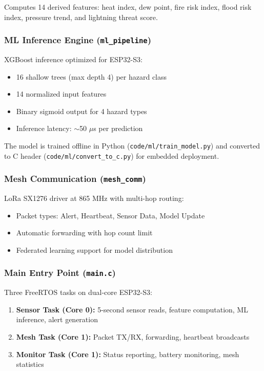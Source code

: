 Computes 14 derived features: heat index, dew point, fire risk index, flood risk index, pressure trend, and lightning threat score.

\subsubsection{ML Inference Engine (\texttt{ml\_pipeline})}
XGBoost inference optimized for ESP32-S3:
\begin{itemize}
    \item 16 shallow trees (max depth 4) per hazard class
    \item 14 normalized input features
    \item Binary sigmoid output for 4 hazard types
    \item Inference latency: $\sim$50 $\mu$s per prediction
\end{itemize}

The model is trained offline in Python (\texttt{code/ml/train\_model.py}) and converted to C header (\texttt{code/ml/convert\_to\_c.py}) for embedded deployment.

\subsubsection{Mesh Communication (\texttt{mesh\_comm})}
LoRa SX1276 driver at 865 MHz with multi-hop routing:
\begin{itemize}
    \item Packet types: Alert, Heartbeat, Sensor Data, Model Update
    \item Automatic forwarding with hop count limit
    \item Federated learning support for model distribution
\end{itemize}

\subsubsection{Main Entry Point (\texttt{main.c})}
Three FreeRTOS tasks on dual-core ESP32-S3:
\begin{enumerate}
    \item \textbf{Sensor Task (Core 0):} 5-second sensor reads, feature computation, ML inference, alert generation
    \item \textbf{Mesh Task (Core 1):} Packet TX/RX, forwarding, heartbeat broadcasts
    \item \textbf{Monitor Task (Core 1):} Status reporting, battery monitoring, mesh statistics
\end{enumerate}

